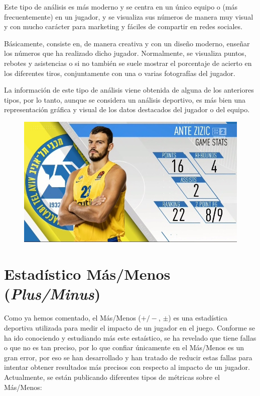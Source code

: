 \documentclass[paper=a4, fontsize=9pt]{article}
\begin{document}
Este tipo de análisis es más moderno y se centra en un único equipo o (más frecuentemente) en un jugador, y se visualiza sus números de manera muy visual y con mucho carácter para marketing y fáciles de compartir en redes sociales.

Básicamente, consiste en, de manera creativa y con un diseño moderno, enseñar los números que ha realizado dicho jugador. Normalmente, se visualiza puntos, rebotes y asistencias o si no también se suele mostrar el porcentaje de acierto en los diferentes tiros, conjuntamente con una o varias fotografías del jugador.

La información de este tipo de análisis viene obtenida de alguna de los anteriores tipos, por lo tanto, aunque se considera un análisis deportivo, es más bien una representación gráfica y visual de los datos destacados del jugador o del equipo.

\begin{figure}[H]
\centering
\includegraphics[width=.5\linewidth]{imagenes/GraphicStat.jpg}
\label{fig:GS_AZ}
\end{figure}


\clearpage

\section{Estadístico Más/Menos (\emph{Plus/Minus})}

Como ya hemos comentado, el Más/Menos ($+/-$, $\pm$) es una estadística deportiva utilizada para medir el impacto de un jugador en el juego. Conforme se ha ido conociendo y estudiando más este estaístico, se ha revelado que tiene fallas o que no es tan preciso, por lo que confiar únicamente en el Más/Menos es un gran error, por eso se han desarrollado y han tratado de reducir estas fallas para intentar obtener resultados más precisos con respecto al impacto de un jugador. Actualmente, se están publicando diferentes tipos de métricas sobre el Más/Menos:
\end{document}
